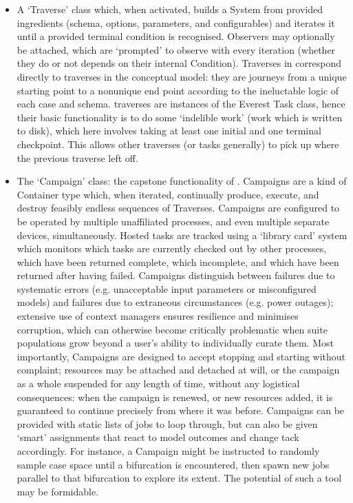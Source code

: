 \documentclass[letterpaper,10pt,english]{jupyterBook}
\begin{document}
\begin{itemize}
\item {} 
\sphinxAtStartPar
A ‘Traverse’ class which, when activated, builds a System from provided ingredients (schema, options, parameters, and configurables) and iterates it until a provided terminal condition is recognised. Observers may optionally be attached, which are ‘prompted’ to observe with every iteration (whether they do or not depends on their internal Condition). Traverses in  correspond directly to traverses in the conceptual model: they are journeys from a unique starting point to a non\sphinxhyphen{}unique end point according to the ineluctable logic of each case and schema.  traverses are instances of the Everest Task class, hence their basic functionality is to do some ‘indelible work’ (work which is written to disk), which here involves taking at least one initial and one terminal checkpoint. This allows other traverses (or tasks generally) to pick up where the previous traverse left off.

\item {} 
\sphinxAtStartPar
The ‘Campaign’ class: the capstone functionality of . Campaigns are a kind of  Container type which, when iterated, continually produce, execute, and destroy feasibly endless sequences of Traverses. Campaigns are configured to be operated by multiple unaffiliated processes, and even multiple separate devices, simultaneously. Hosted tasks are tracked using a ‘library card’ system which monitors which tasks are currently checked out by other processes, which have been returned complete, which incomplete, and which have been returned after having failed. Campaigns distinguish between failures due to systematic errors (e.g. unacceptable input parameters or misconfigured models) and failures due to extraneous circumstances (e.g. power outages); extensive use of context managers ensures resilience and minimises corruption, which can otherwise become critically problematic when suite populations grow beyond a user’s ability to individually curate them. Most importantly, Campaigns are designed to accept stopping and starting without complaint; resources may be attached and detached at will, or the campaign as a whole suspended for any length of time, without any logistical consequences: when the campaign is renewed, or new resources added, it is guaranteed to continue precisely from where it was before. Campaigns can be provided with static lists of jobs to loop through, but can also be given ‘smart’ assignments that react to model outcomes and change tack accordingly. For instance, a Campaign might be instructed to randomly sample case space until a bifurcation is encountered, then spawn new jobs parallel to that bifurcation to explore its extent. The potential of such a tool may be formidable.

\end{itemize}
\end{document}
